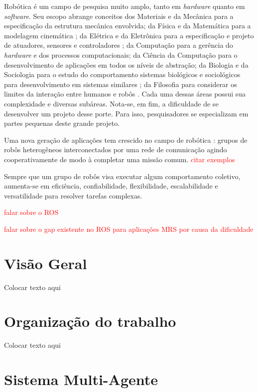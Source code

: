 Robótica é um campo de pesquisa muito amplo, tanto em \textit{hardware} quanto em \textit{software}. Seu escopo abrange conceitos dos Materiais e da Mecânica para a especificação da estrutura mecânica envolvida; da Física e da Matemática para a modelagem cinemática \cite{ref:tolani2000kinematics}; da Elétrica e da Eletrônica para a especificação e projeto de atuadores, sensores e controladores \cite{ref:zaremsky1986servo}; da Computação para a gerência do \textit{hardware} e dos processos computacionais; da Ciência da Computação para o desenvolvimento de aplicações em todos os níveis de abstração; da Biologia e da Sociologia para o estudo do comportamento sistemas biológicos e sociológicos para desenvolvimento em sistemas similares \cite{ref:csahin2004swarm, ref:gerkey2002murdoch}; da Filosofia para considerar os limites da interação entre humanos e robôs \cite{ref:mackworth2011ethics, ref:siqueira2016robotic}. Cada uma dessas áreas possui sua complexidade e diversas subáreas. Nota-se, em fim, a dificuldade de se desenvolver um projeto desse porte. Para isso, pesquisadores se especializam em partes pequenas deste grande projeto. 



    Uma nova geração de aplicações tem crescido no campo de robótica \cite{ref:mohamed2008middleware}: grupos de robôs heterogêneos interconectados por uma rede de comunicação agindo cooperativamente de modo à completar uma missão comum. \textcolor{red}{citar exemplos}
    
    Sempre que um grupo de robôs visa executar algum comportamento coletivo, aumenta-se em eficiência, confiabilidade, flexibilidade, escalabilidade e versatilidade para resolver tarefas complexas.
    
    \textcolor{red}{falar sobre o ROS}
    
    \textcolor{red}{falar sobre o gap existente no ROS para aplicações MRS por causa da dificuldade}

    \section{Visão Geral}
        Colocar texto aqui
    
    \section{Organização do trabalho}
        Colocar texto aqui
    
    \section{Sistema Multi-Agente}
    
